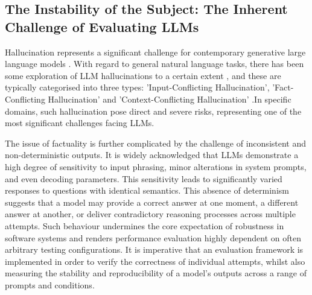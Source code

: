 \subsection{The Instability of the Subject: The Inherent Challenge of Evaluating LLMs}

Hallucination represents a significant challenge for contemporary generative large language models \cite{huang2025survey}. With regard to general natural language tasks, there has been some exploration of LLM hallucinations to a certain extent \cite{tonmoy2024comprehensive}\cite{ye2023cognitive}\cite{zhang2025siren}, and these are typically categorised into three types: 'Input-Conflicting Hallucination', 'Fact-Conflicting Hallucination' and 'Context-Conflicting Hallucination' \cite{zhang2025siren}.In specific domains, such hallucination pose direct and severe risks, representing one of the most significant challenges facing LLMs.

The issue of factuality is further complicated by the challenge of inconsistent and non-deterministic outputs\cite{atil2024non}\cite{stureborg2024large}. It is widely acknowledged that LLMs demonstrate a high degree of sensitivity to input phrasing\cite{an2024make}, minor alterations in system prompts\cite{he2024does}, and even decoding parameters\cite{spector2023accelerating}. This sensitivity leads to significantly varied responses to questions with identical semantics\cite{atil2024non}. This absence of determinism suggests that a model may provide a correct answer at one moment, a different answer at another, or deliver contradictory reasoning processes across multiple attempts\cite{turpin2023language}. Such behaviour undermines the core expectation of robustness in software systems and renders performance evaluation highly dependent on often arbitrary testing configurations\cite{chen2024chatunitest}. It is imperative that an evaluation framework is implemented in order to verify the correctness of individual attempts, whilst also measuring the stability and reproducibility of a model's outputs across a range of prompts and conditions.

